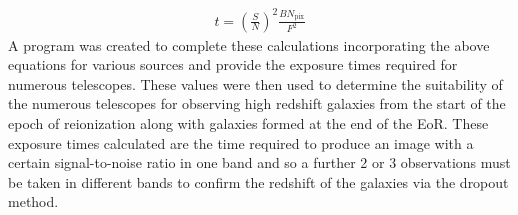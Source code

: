 		\begin{align}
			t = (\frac{S}{N})^2 \frac{BN_\text{pix}}{F^2}
		\end{align}
		A program was created to complete these calculations incorporating the above equations for various sources and provide the exposure times required for numerous telescopes. These values were then used to determine the suitability of the numerous telescopes for observing high redshift galaxies from the start of the epoch of reionization along with galaxies formed at the end of the EoR. These exposure times calculated are the time required to produce an image with a certain signal-to-noise ratio in one band and so a further 2 or 3 observations must be taken in different bands to confirm the redshift of the galaxies via the dropout method.

